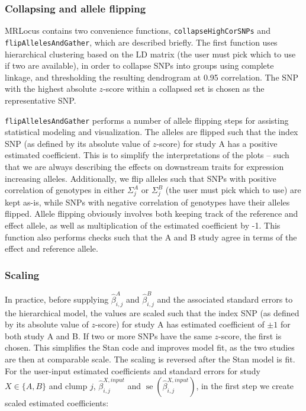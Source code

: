 \documentclass[11pt]{article}
\DeclareMathOperator{\se}{\textrm{se}}
\begin{document}
\subsubsection{Collapsing and allele flipping}

MRLocus contains two convenience functions,
\texttt{collapseHighCorSNPs} and \texttt{flipAllelesAndGather}, which
are described briefly. The first function uses hierarchical clustering
based on the LD matrix (the user must pick which to use if two are
available), in order to collapse SNPs into groups using complete
linkage, and thresholding the resulting dendrogram at 0.95
correlation. The SNP with the highest absolute $z$-score within a
collapsed set is chosen as the representative SNP.

\texttt{flipAllelesAndGather} performs a number of allele flipping
steps for assisting statistical modeling and visualization. The
alleles are flipped such that the index SNP (as defined by its
absolute value of $z$-score) for study A has a positive estimated
coefficient. This is to simplify the interpretations of the plots --
such that we are always describing the effects on downstream traits
for expression increasing alleles. Additionally, we flip alleles such
that SNPs with positive correlation of genotypes in either
$\Sigma_j^A$ or $\Sigma_j^B$ (the user must pick which to use) are
kept as-is, while SNPs with negative correlation of genotypes have
their alleles flipped. Allele flipping obviously involves both keeping
track of the reference and effect allele, as well as multiplication of
the estimated coefficient by -1. This function also performs checks
such that the A and B study agree in terms of the effect and reference
allele.

\subsubsection{Scaling}

In practice, before supplying
$\widehat{\beta}^A_{i,j}$ and $\widehat{\beta}^B_{i,j}$
and the associated standard errors to the hierarchical model, the
values are scaled such that the index SNP (as defined by its absolute
value of $z$-score) for study A has estimated coefficient of $\pm 1$ for
both study A and B. If two or more SNPs have the same $z$-score, the
first is chosen.  This simplifies the Stan code and improves model
fit, as the two studies are then at comparable scale. The scaling is
reversed after the Stan model is fit.
For the user-input estimated coefficients and standard errors for
study $X \in \{A,B\}$ and clump $j$,
$\widehat{\beta}^{X,input}_{i,j}$ and $\se(\widehat{\beta}^{X,input}_{i,j})$,
in the first step we create scaled estimated coefficients:
\end{document}
